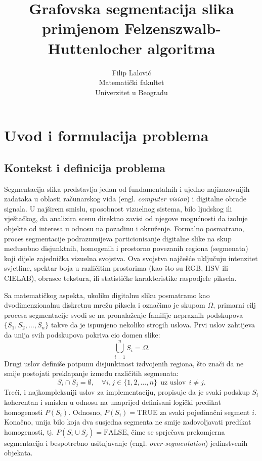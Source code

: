 \documentclass[11pt,a4paper]{article}
\title{Grafovska segmentacija slika primjenom Felzenszwalb-Huttenlocher algoritma}
\author{Filip Lalovi\'c \\ Matemati\v{c}ki fakultet \\ Univerzitet u Beogradu}
\date{}
\begin{document}
\maketitle

\section{Uvod i formulacija problema}

\subsection{Kontekst i definicija problema}
Segmentacija slika predstavlja jedan od fundamentalnih i ujedno najizazovnijih zadataka u oblasti računarskog vida (engl. \textit{computer vision}) i digitalne obrade signala. U najširem smislu, sposobnost vizuelnog sistema, bilo ljudskog ili vještačkog, da analizira scenu direktno zavisi od njegove mogućnosti da izoluje objekte od interesa u odnosu na pozadinu i okruženje. Formalno posmatrano, proces segmentacije podrazumijeva particionisanje digitalne slike na skup međusobno disjunktnih, homogenih i prostorno povezanih regiona (segmenata) koji dijele zajednička vizuelna svojstva. Ova svojstva najčešće uključuju intenzitet svjetline, spektar boja u različitim prostorima (kao što su RGB, HSV ili CIELAB), obrasce tekstura, ili statističke karakteristike raspodjele piksela.

Sa matematičkog aspekta, ukoliko digitalnu sliku posmatramo kao dvodimenzionalnu diskretnu mrežu piksela i označimo je skupom $\Omega$, primarni cilj procesa segmentacije svodi se na pronalaženje familije nepraznih podskupova $\{S_1, S_2, \dots, S_n\}$ takve da je ispunjeno nekoliko strogih uslova. Prvi uslov zahtijeva da unija svih podskupova pokriva cio domen slike:
\begin{equation}
    \bigcup_{i=1}^{n} S_i = \Omega.
\end{equation}
Drugi uslov definiše potpunu disjunktnost izdvojenih regiona, što znači da ne smije postojati preklapanje između različitih segmenata:
\begin{equation}
    S_i \cap S_j = \emptyset, \quad \forall i, j \in \{1, 2, \dots, n\} \ \ \text{uz uslov} \ \ i \neq j.
\end{equation}
Treći, i najkompleksniji uslov za implementaciju, propisuje da je svaki podskup $S_i$ koherentan i smislen u odnosu na unaprijed definisani logički predikat homogenosti $P(S_i)$. Odnosno, $P(S_i) = \text{TRUE}$ za svaki pojedinačni segment $i$. Konačno, unija bilo koja dva susjedna segmenta ne smije zadovoljavati predikat homogenosti, tj. $P(S_i \cup S_j) = \text{FALSE}$, čime se sprječava prekomjerna segmentacija i bespotrebno usitnjavanje (engl. \textit{over-segmentation}) jedinstvenih objekata.
\end{document}
